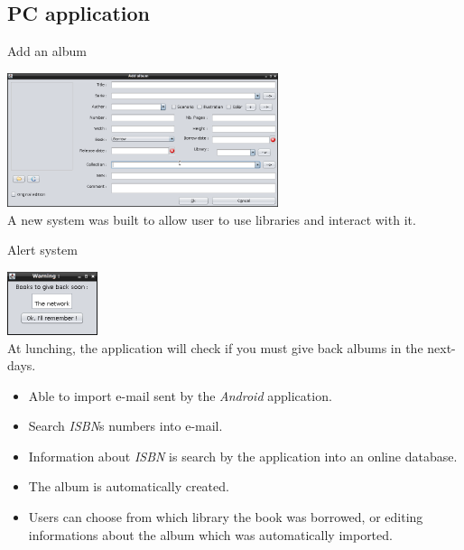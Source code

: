 \documentclass{beamer}
\begin{document}
\subsection{PC application}
\begin{frame}
\begin{block}{Add an album}
\begin{center}
\includegraphics[width=300px]{figs/t3_ajoutAlbum.png} \\
A new system was built to allow user to use libraries and interact with it.
\end{center}
\end{block}
\end{frame}

\begin{frame}
\begin{block}{Alert system}
\begin{center}
\includegraphics[width=100px]{figs/t3_warning.png} \\
At lunching, the application will check if you must give back albums in the next-days.
\end{center}
\end{block}
\end{frame}

\begin{frame}
\begin{itemize}
\item Able to import e-mail sent by the \emph{Android} application.
\pause \item Search \emph{ISBN}s numbers into e-mail.
\pause \item Information about \emph{ISBN} is search by the application into an online database.
\pause \item The album is automatically created.
\pause \item Users can choose from which library the book was borrowed, or editing informations about the album which was automatically imported.
\end{itemize}
\end{frame}
\end{document}
